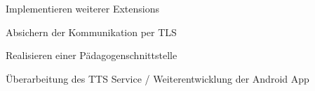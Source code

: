 \begin{frame}
\begin{block}{}
	Implementieren weiterer Extensions
\end{block}
\begin{block}{}
	Absichern der Kommunikation per TLS
\end{block}
\begin{block}{}
	Realisieren einer Pädagogenschnittstelle
\end{block}
\begin{block}{}
	Überarbeitung des TTS Service / Weiterentwicklung der Android App
\end{block}
\end{frame}